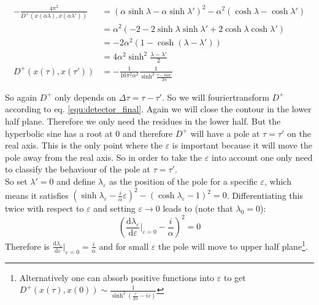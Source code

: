 \begin{align}
-\frac{4\pi^2}{D^+(x(\alpha\lambda), x(\alpha\lambda'))} &= (\alpha \sinh \lambda - \alpha \sinh \lambda')^2 - \alpha^2 (\cosh \lambda - \cosh \lambda')\\
	&= \alpha^2 \left(-2 - 2\sinh\lambda \sinh\lambda' + 2 \cosh\lambda \cosh\lambda'\right)\\
	&= - 2 \alpha^2 \left(1 - \cosh(\lambda-\lambda')\right)\\
	&= 4 \alpha^2 \sinh^2\frac{\lambda-\lambda'}{2}\\
D^+(x(\tau), x(\tau')) &= -\frac{1}{16\pi^2\alpha^2} \frac{1}{\sinh^2\frac{\tau-tau'}{2\alpha}}
\end{align}

So again \(D^+\) only depends on \(\Delta\tau = \tau-\tau'\). So we will fouriertransform \(D^+\) according to eq. \ref{equ:detector_final}. Again we will close the contour in the lower half plane. Therefore we only need the residues in the lower half. But the hyperbolic sine has a root at \(0\) and therefore \(D^+\) will have a pole at \(\tau = \tau'\) on the real axis. This is the only point where the \(\varepsilon\) is important because it will move the pole away from the real axis. So in order to take the \(\varepsilon\) into account one only need to classify the behaviour of the pole at \(\tau = \tau'\).\\
So set \(\lambda' = 0\) and define \(\lambda_\varepsilon\) as the position of the pole for a specific \(\varepsilon\), which means it satisfies \((\sinh\lambda_\varepsilon - \frac{i}{\alpha}\varepsilon)^2 - (\cosh\lambda_\varepsilon - 1)^2 = 0\). Differentiating this twice with respect to \(\varepsilon\) and setting \(\varepsilon \to 0\) leads to (note that \(\lambda_0 = 0\)): \[\left(\frac{\mathrm{d}\lambda_\varepsilon}{\mathrm{d}\varepsilon}|_{\varepsilon = 0} - \frac{i}{\alpha}\right)^2 = 0\] Therefore is \(\frac{\mathrm{d}\lambda_\varepsilon}{\mathrm{d}\varepsilon}|_{\varepsilon = 0} = \frac{i}{\alpha}\) and for small \(\varepsilon\) the pole will move to upper half plane\footnote{Alternatively one can absorb positive functions into \(\varepsilon\) to get \(D^+(x(\tau), x(0)) \sim \frac{1}{\sinh^2\left(\frac{\tau}{2\alpha} - i \varepsilon\right)}\)}.\\

